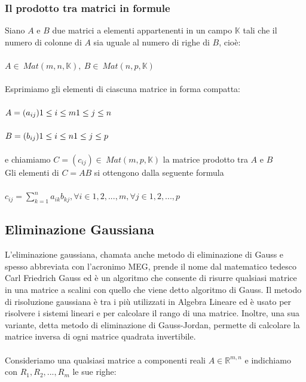 \documentclass{report}
\begin{document}
\subsubsection{Il prodotto tra matrici in formule}

Siano $A$ e $B$ due matrici a elementi appartenenti in un campo $\mathbb{K}$ tali che il numero di colonne di $A$ sia uguale al numero di righe di $B$, cioè:
\\
\\
$A \in \ Mat(m,n,\mathbb{K}), \ B \in \ Mat(n,p,\mathbb{K})$
\\
\\
Esprimiamo gli elementi di ciascuna matrice in forma compatta:
\\
\\
$A=(a_{ij})
\\
1 \le i \le m \\
1 \le j \le n 
$
\\
\\
$B=(b_{ij})
\\
1 \le i \le n \\
1 \le j \le p 
$
\\
\\
e chiamiamo $C = (c_{ij}) \in \ Mat(m,p,\mathbb{K})$ la matrice prodotto tra $A$ e $B$ 
\\
Gli elementi di $C=AB$ si ottengono dalla seguente formula
\\
\\
$c_{ij} = \sum_{k=1}^{n} a_{ik}b_{kj}, \forall i \in {1,2,...,m}, \forall j \in {1,2,...,p}$

\subsection{Eliminazione Gaussiana}

L'eliminazione gaussiana, chamata anche metodo di eliminazione di Gauss e spesso abbreviata con l'acronimo MEG, prende il nome dal matematico tedesco Carl Friedrich Gauss ed è un algoritmo che consente di risurre qualsiasi matrice in una matrice a scalini con quello che viene detto algoritmo di Gauss.
Il metodo di risoluzione gaussiana è tra i più utilizzati in Algebra Lineare ed è usato per risolvere i sistemi lineari e per calcolare il rango di una matrice. Inoltre, una sua variante, detta metodo di eliminazione di Gauss-Jordan, permette di calcolare la matrice inversa di ogni matrice quadrata invertibile.
\\
\\
Consideriamo una qualsiasi matrice a componenti reali $A \in \mathbb{R}^{m,n}$ e indichiamo con $R_1,R_2,...,R_m$ le sue righe:
\\
\\
\end{document}
